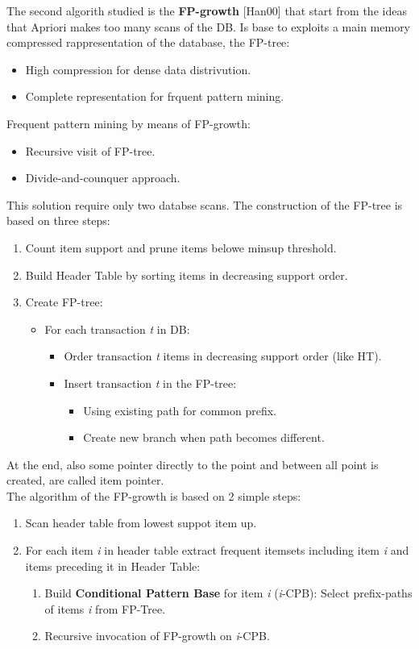 \documentclass[12pt]{article}
\begin{document}
The second algorith studied is the \textbf{FP-growth} [Han00] that start from the ideas that Apriori makes too many scans of the DB. Is base to exploits a main memory compressed rappresentation of the database, the FP-tree:
\begin{itemize}
  \item High compression for dense data distrivution.
  \item Complete representation for frquent pattern mining.
\end{itemize}
Frequent pattern mining by means of FP-growth:
\begin{itemize}
  \item Recursive visit of FP-tree.
  \item Divide-and-counquer approach.
\end{itemize}
This solution require only two databse scans. The construction of the FP-tree is based on three steps:
\begin{enumerate}
  \item Count item support and prune items belowe minsup threshold.
  \item Build Header Table by sorting items in decreasing support order.
  \item Create FP-tree:
  \begin{itemize}
    \item For each transaction \textit{t} in DB:
    \begin{itemize}
      \item Order transaction \textit{t} items in decreasing support order (like HT).
      \item Insert transaction \textit{t} in the FP-tree:
      \begin{itemize}
        \item Using existing path for common prefix.
        \item Create new branch when path becomes different.
      \end{itemize}
    \end{itemize}
  \end{itemize}
\end{enumerate}
At the end, also some pointer directly to the point and between all point is created, are called item pointer.\\
The algorithm of the FP-growth is based on 2 simple steps:
\begin{enumerate}
  \item Scan header table from lowest suppot item up.
  \item For each item \textit{i} in header table extract frequent itemsets including item \textit{i} and items preceding it in Header Table:
  \begin{enumerate}
    \item Build \textbf{Conditional Pattern Base} for item \textit{i} (\textit{i}-CPB): Select prefix-paths of items \textit{i} from FP-Tree.
    \item Recursive invocation of FP-growth on \textit{i}-CPB.
  \end{enumerate}
\end{enumerate}
\end{document}
